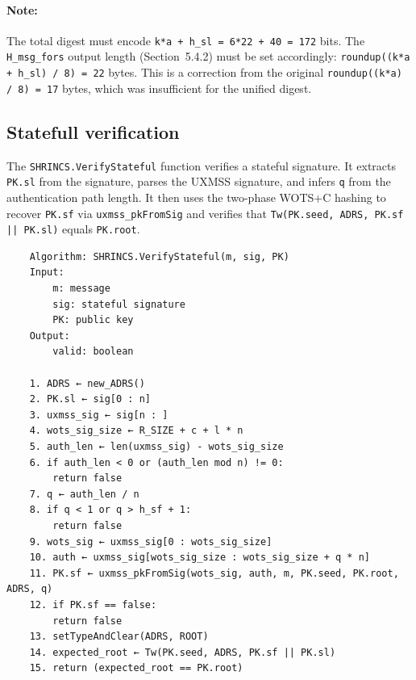 \paragraph{Note:} The total digest must encode \texttt{k*a + h\_sl = 6*22 + 40 = 172} bits. The \texttt{H\_msg\_fors} output length (Section~5.4.2) must be set accordingly: \texttt{roundup((k*a + h\_sl) / 8) = 22} bytes. This is a correction from the original \texttt{roundup((k*a) / 8) = 17} bytes, which was insufficient for the unified digest.

\subsection{Statefull verification}
The \texttt{SHRINCS.VerifyStateful} function verifies a stateful signature. It extracts \texttt{PK.sl} from the signature, parses the UXMSS signature, and infers \texttt{q} from the authentication path length. It then uses the two-phase WOTS+C hashing to recover \texttt{PK.sf} via \texttt{uxmss\_pkFromSig} and verifies that \texttt{Tw(PK.seed, ADRS, PK.sf || PK.sl)} equals \texttt{PK.root}.
\begin{verbatim}
    Algorithm: SHRINCS.VerifyStateful(m, sig, PK)
    Input:
        m: message
        sig: stateful signature
        PK: public key
    Output:
        valid: boolean

    1. ADRS ← new_ADRS()
    2. PK.sl ← sig[0 : n]
    3. uxmss_sig ← sig[n : ]
    4. wots_sig_size ← R_SIZE + c + l * n
    5. auth_len ← len(uxmss_sig) - wots_sig_size
    6. if auth_len < 0 or (auth_len mod n) != 0:
        return false
    7. q ← auth_len / n
    8. if q < 1 or q > h_sf + 1:
        return false
    9. wots_sig ← uxmss_sig[0 : wots_sig_size]
    10. auth ← uxmss_sig[wots_sig_size : wots_sig_size + q * n]
    11. PK.sf ← uxmss_pkFromSig(wots_sig, auth, m, PK.seed, PK.root, ADRS, q)
    12. if PK.sf == false:
        return false
    13. setTypeAndClear(ADRS, ROOT)
    14. expected_root ← Tw(PK.seed, ADRS, PK.sf || PK.sl)
    15. return (expected_root == PK.root)
\end{verbatim}

